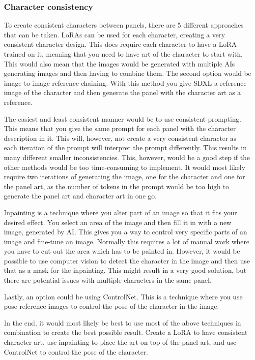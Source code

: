\subsubsection{Character consistency}
To create consistent characters between panels, there are 5 different approaches that can be taken. LoRAs can be used for each character, creating a very consistent character design. This does require each character to have a LoRA trained on it, meaning that you need to have art of the character to start with. This would also mean that the images would be generated with multiple AIs generating images and then having to combine them. 
The second option would be image-to-image reference chaining. With this method you give SDXL a reference image of the character and then generate the panel with the character art as a reference. 

The easiest and least consistent manner would be to use consistent prompting. This means that you give the same prompt for each panel with the character description in it. This will, however, not create a very consistent character as each iteration of the prompt will interpret the prompt differently. This results in many different smaller inconsistencies. This, however, would be a good step if the other methods would be too time-consuming to implement. It would most likely require two iterations of generating the image, one for the character and one for the panel art, as the number of tokens in the prompt would be too high to generate the panel art and character art in one go.

Inpainting is a technique where you alter part of an image so that it fits your desired effect. You select an area of the image and then fill it in with a new image, generated by AI. This gives you a way to control very specific parts of an image and fine-tune an image. Normally this requires a lot of manual work where you have to cut out the area which has to be painted in. However, it would be possible to use computer vision to detect the character in the image and then use that as a mask for the inpainting. This might result in a very good solution, but there are potential issues with multiple characters in the same panel.

Lastly, an option could be using ControlNet. This is a technique where you use pose reference images to control the pose of the character in the image.

In the end, it would most likely be best to use most of the above techniques in combination to create the best possible result. Create a LoRA to have consistent character art, use inpainting to place the art on top of the panel art, and use ControlNet to control the pose of the character. 

